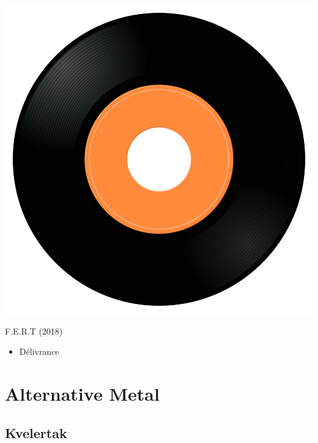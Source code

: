\begin{minipage}[t]{0.25\textwidth}
\captionsetup{type=figure}
\includegraphics[width=\textwidth]{Images/cover.png}
\caption*{F.E.R.T (2018)}
\end{minipage}
\begin{minipage}[t]{0.25\textwidth}\vspace{0pt}
\begin{itemize}[nosep,leftmargin=1em,labelwidth=*,align=left]
	\setlength{\itemsep}{0pt}
	\item Délivrance
\end{itemize}
\end{minipage}



\section{Alternative Metal}

\subsection{Kvelertak}


